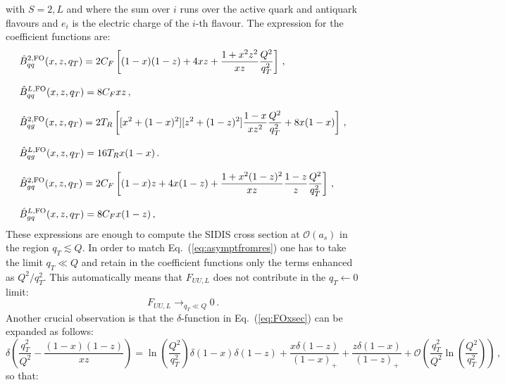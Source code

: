 \documentclass[10pt,a4paper]{article}
\begin{document}
with $S=2,L$ and where the sum over $i$ runs over the active quark and
antiquark flavours and $e_i$ is the electric charge of the $i$-th
flavour. The expression for the coefficient functions are:
\begin{equation}\label{eq:Bacchettaetal}
\begin{array}{l}
\displaystyle \hat{B}_{qq}^{2,\rm FO}(x,z,q_T) = 2C_F\left[(1-x)(1-z)+4xz+\frac{1+x^2z^2}{xz}\frac{Q^2}{q_T^2}\right]\,,\\
\\
\displaystyle \hat{B}_{qq}^{L,\rm FO}(x,z,q_T) = 8C_Fxz\,,\\
\\
\displaystyle \hat{B}_{qg}^{2,\rm FO}(x,z,q_T) = 2T_R\left[[x^2+(1-x)^2][z^2+(1-z)^2]\frac{1-x}{xz^2}\frac{Q^2}{q_T^2} +8x(1-x)\right]\,,\\
\\
\displaystyle \hat{B}_{qg}^{L,\rm FO}(x,z,q_T) = 16T_Rx(1-x)\,.\\
\\
\displaystyle \hat{B}_{gq}^{2,\rm FO}(x,z,q_T) = 2C_F\left[(1-x)z+4x(1-z)+\frac{1+x^2(1-z)^2}{xz}\frac{1-z}{z}\frac{Q^2}{q_T^2}\right]\,,\\
\\
\displaystyle \hat{B}_{gq}^{L,\rm FO}(x,z,q_T) = 8C_Fx(1-z)\,,
\end{array}
\end{equation}
These expressions are enough to compute the SIDIS cross section at
$\mathcal{O}(a_s)$ in the region $q_T \lesssim Q$. In order to match
Eq.~(\ref{eq:asymptfromres}) one has to take the limit $q_T\ll Q$ and
retain in the coefficient functions only the terms enhanced as
$Q^2/q_T^2$. This automatically means that $F_{UU,L}$ does not
contribute in the $q_T\leftarrow 0$ limit:
\begin{equation}
F_{UU,L}\mathop{\longrightarrow}_{q_T\ll Q} 0\,.
\end{equation}
Another crucial observation is that the $\delta$-function in
Eq.~(\ref{eq:FOxsec}) can be expanded as follows:
\begin{equation}
  \delta\left(\frac{q_T^2}{Q^2}-\frac{(1-x)(1-z)}{xz}\right)
  =\ln\left(\frac{Q^2}{q_T^2}\right)\delta(1-x) \delta(1-z) +
  \frac{x\delta(1-z)}{(1-x)_+}+ \frac{z\delta(1-x)}{(1-z)_+} +\mathcal{O}\left(\frac{q_T^2}{Q^2}\ln\left(\frac{Q^2}{q_T^2}\right)\right)\,,
\end{equation}
so that:
\end{document}
